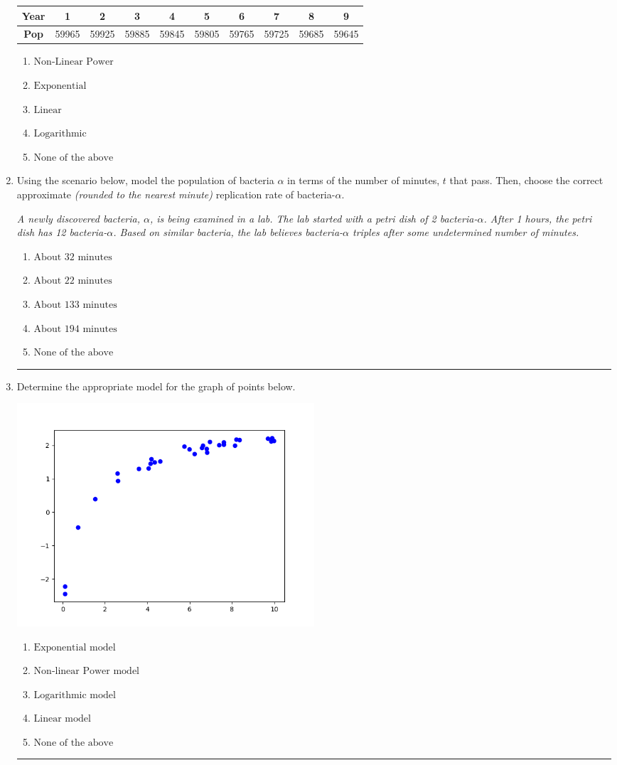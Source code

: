 \documentclass[14pt]{extbook}
\newcommand{\litem}[1]{\item#1\hspace*{-1cm}\rule{\textwidth}{0.4pt}}
\begin{document}
\begin{enumerate}
{\begin{tabular}{c|c|c|c|c|c|c|c|c|c}
\textbf{Year} &1 &2 &3 &4 &5 &6 &7 &8 &9\tabularnewline \hline
\textbf{Pop} &59965 &59925 &59885 &59845 &59805 &59765 &59725 &59685 &59645\end{tabular}\begin{enumerate}[label=\Alph*.]
\item \( \text{Non-Linear Power} \)
\item \( \text{Exponential} \)
\item \( \text{Linear} \)
\item \( \text{Logarithmic} \)
\item \( \text{None of the above} \)

\end{enumerate} }
\litem{
Using the scenario below, model the population of bacteria $\alpha$ in terms of the number of minutes, $t$ that pass. Then, choose the correct approximate \textit{(rounded to the nearest minute)} replication rate of bacteria-$\alpha$.
\begin{center}
    \textit{ A newly discovered bacteria, $\alpha$, is being examined in a lab. The lab started with a petri dish of 2 bacteria-$\alpha$. After 1 hours, the petri dish has 12 bacteria-$\alpha$. Based on similar bacteria, the lab believes bacteria-$\alpha$ triples after some undetermined number of minutes. }
\end{center}
\begin{enumerate}[label=\Alph*.]
\item \( \text{About } 32 \text{ minutes} \)
\item \( \text{About } 22 \text{ minutes} \)
\item \( \text{About } 133 \text{ minutes} \)
\item \( \text{About } 194 \text{ minutes} \)
\item \( \text{None of the above} \)

\end{enumerate} }
\litem{
Determine the appropriate model for the graph of points below.
\begin{center}
    \includegraphics[width=0.5\textwidth]{../Figures/identifyModelGraph11CopyB.png}
\end{center}
\begin{enumerate}[label=\Alph*.]
\item \( \text{Exponential model} \)
\item \( \text{Non-linear Power model} \)
\item \( \text{Logarithmic model} \)
\item \( \text{Linear model} \)
\item \( \text{None of the above} \)


\end{enumerate}}
\end{enumerate}
\end{document}
